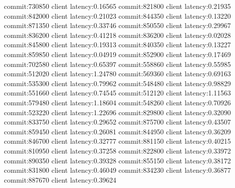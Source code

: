commit:730850 client latency:0.16565
commit:821800 client latency:0.21935
commit:842000 client latency:0.21023
commit:844350 client latency:0.13220
commit:871350 client latency:0.33746
commit:850550 client latency:0.29967
commit:836200 client latency:0.41218
commit:836200 client latency:0.02028
commit:845800 client latency:0.19313
commit:840350 client latency:0.13227
commit:859850 client latency:0.04919
commit:852900 client latency:0.17469
commit:702580 client latency:0.65397
commit:558860 client latency:0.55985
commit:512020 client latency:1.24780
commit:569360 client latency:0.69163
commit:535300 client latency:0.79962
commit:548480 client latency:0.98829
commit:551660 client latency:0.74545
commit:512120 client latency:1.11563
commit:579480 client latency:1.18604
commit:548260 client latency:0.70926
commit:523220 client latency:1.22696
commit:829800 client latency:0.32090
commit:833750 client latency:0.29652
commit:875700 client latency:0.43507
commit:859450 client latency:0.26081
commit:844950 client latency:0.36209
commit:846700 client latency:0.32777
commit:881150 client latency:0.40215
commit:810950 client latency:0.37258
commit:822800 client latency:0.33972
commit:890350 client latency:0.39328
commit:855150 client latency:0.38172
commit:831800 client latency:0.46049
commit:834230 client latency:0.36877
commit:887670 client latency:0.39624